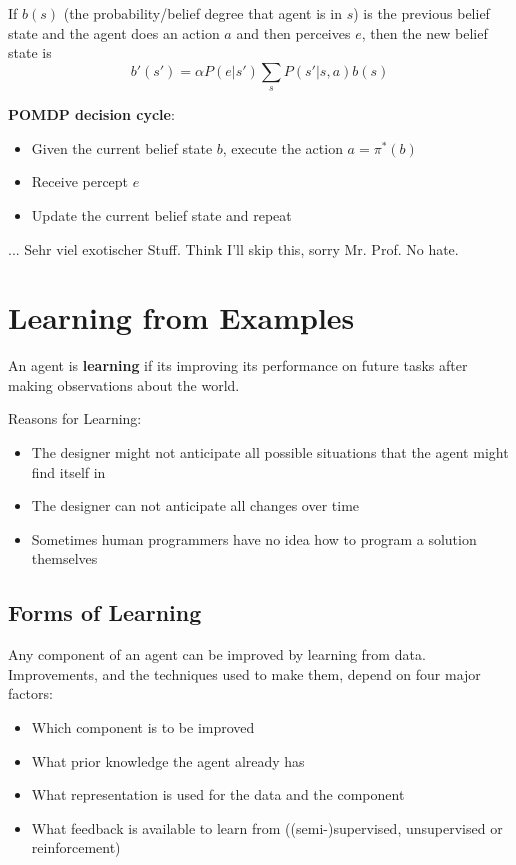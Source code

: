 \documentclass{scrartcl}
\begin{document}
If \(b(s)\) (the probability/belief degree that agent is in \(s\)) is the previous belief state and the agent does an action \(a\) and then perceives \(e\), then the new belief state is
\[b'(s') = \alpha P(e|s') \sum_s P(s'|s,a)b(s)\]

\textbf{POMDP decision cycle}:
\begin{itemize}
    \item
        Given the current belief state \(b\), execute the action \(a=\pi^*(b)\)
    \item
        Receive percept \(e\)
    \item
        Update the current belief state and repeat
\end{itemize}

\bigbreak

... Sehr viel exotischer Stuff. Think I'll skip this, sorry Mr. Prof. No hate.

\section{Learning from Examples}
An agent is \textbf{learning} if its improving its performance on future tasks after making observations about the world.

Reasons for Learning:
\begin{itemize}
    \item
        The designer might not anticipate all possible situations that the agent might find itself in
    \item
        The designer can not anticipate all changes over time
    \item
        Sometimes human programmers have no idea how to program a solution themselves
\end{itemize}

\subsection{Forms of Learning}
Any component of an agent can be improved by learning from data. Improvements, and the techniques used to make them, depend on four major factors:
\begin{itemize}
    \item
        Which component is to be improved
    \item
        What prior knowledge the agent already has
    \item
        What representation is used for the data and the component
    \item
        What feedback is available to learn from ((semi-)supervised, unsupervised or reinforcement)
\end{itemize}
\end{document}
